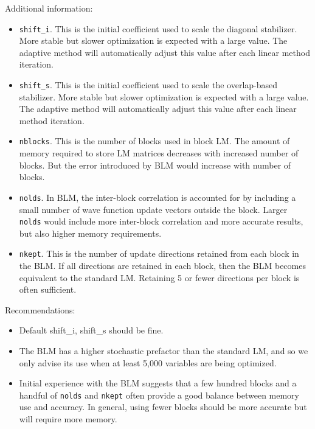 Additional information:
\begin{itemize}
  \item \texttt{shift\_i}.  This is the initial coefficient used to scale the diagonal stabilizer.
                            More stable but slower optimization is expected with a large value.
                            The adaptive method will automatically adjust this value after each linear method iteration.
  \item \texttt{shift\_s}.  This is the initial coefficient used to scale the overlap-based stabilizer.
                            More stable but slower optimization is expected with a large value.
                            The adaptive method will automatically adjust this value after each linear method iteration.
  \item \texttt{nblocks}.   This is the number of blocks used in block LM. The amount of memory required to store LM matrices decreases
                            with increased number of blocks. But the error introduced by BLM would increase with number of blocks.  
  \item \texttt{nolds}.     In BLM, the inter-block correlation is accounted for by including a small number of wave function update vectors
                            outside the block. Larger \texttt{nolds} would include more inter-block correlation and more accurate results, but 
                            also higher memory requirements. 
  \item \texttt{nkept}.     This is the number of update directions retained from each block in the BLM. If all directions are retained in each block, 
                            then the BLM becomes equivalent to the standard LM.  Retaining 5 or fewer directions per block is often sufficient.
\end{itemize}

Recommendations:
\begin{itemize}
  \item Default shift\_i, shift\_s should be fine. 
  \item The BLM has a higher stochastic prefactor than the standard LM, and so we only advise its use when at least 5,000 variables are being optimized.
  \item Initial experience with the BLM suggests that a few hundred blocks and a handful of \texttt{nolds} and \texttt{nkept}
        often provide a good balance between memory use and accuracy.  In general, using fewer blocks should be more accurate but will require more memory.
\end{itemize}


